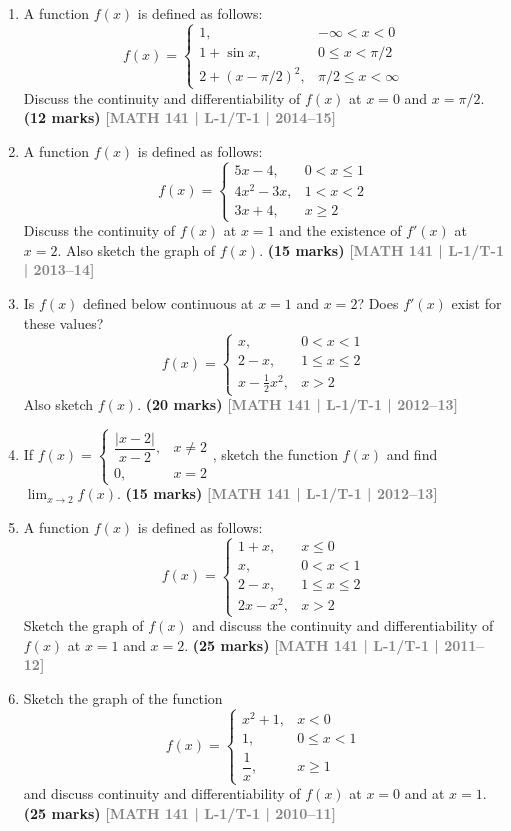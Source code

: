 \documentclass[12pt,a4paper]{article}
\newcommand{\yr}[1]{\hfill\textcolor{gray}{\small\textbf{[#1]}}}
\newcommand{\mk}[1]{\textcolor{orange!70!black}{\small\textbf{(#1 marks)}}}
\begin{document}
\begin{enumerate}
\item A function $f(x)$ is defined as follows:
\[
f(x)=\begin{cases}1, & -\infty<x<0\\ 1+\sin x, & 0\le x<\pi/2\\ 2+(x-\pi/2)^{2}, & \pi/2\le x<\infty\end{cases}
\]
Discuss the continuity and differentiability of $f(x)$ at $x=0$ and $x=\pi/2$.
\mk{12} \yr{MATH 141 | L-1/T-1 | 2014--15}

\item A function $f(x)$ is defined as follows:
\[
f(x)=\begin{cases}5x-4, & 0<x\le 1\\ 4x^{2}-3x, & 1<x<2\\ 3x+4, & x\ge 2\end{cases}
\]
Discuss the continuity of $f(x)$ at $x=1$ and the existence of $f'(x)$ at $x=2$. Also sketch the graph of $f(x)$.
\mk{15} \yr{MATH 141 | L-1/T-1 | 2013--14}

\item Is $f(x)$ defined below continuous at $x=1$ and $x=2$? Does $f'(x)$ exist for these values?
\[
f(x)=\begin{cases}x, & 0<x<1\\ 2-x, & 1\le x\le 2\\ x-\tfrac{1}{2}x^{2}, & x>2\end{cases}
\]
Also sketch $f(x)$.
\mk{20} \yr{MATH 141 | L-1/T-1 | 2012--13}

\item If $f(x)=\begin{cases}\dfrac{|x-2|}{x-2}, & x\neq 2\\[4pt] 0, & x=2\end{cases}$, sketch the function $f(x)$ and find $\displaystyle\lim_{x\to 2}f(x)$.
\mk{15} \yr{MATH 141 | L-1/T-1 | 2012--13}

\item A function $f(x)$ is defined as follows:
\[
f(x)=\begin{cases}1+x, & x\le 0\\ x, & 0<x<1\\ 2-x, & 1\le x\le 2\\ 2x-x^{2}, & x>2\end{cases}
\]
Sketch the graph of $f(x)$ and discuss the continuity and differentiability of $f(x)$ at $x=1$ and $x=2$.
\mk{25} \yr{MATH 141 | L-1/T-1 | 2011--12}

\item Sketch the graph of the function
\[
f(x)=\begin{cases}x^{2}+1, & x<0\\ 1, & 0\le x<1\\ \dfrac{1}{x}, & x\ge 1\end{cases}
\]
and discuss continuity and differentiability of $f(x)$ at $x=0$ and at $x=1$.
\mk{25} \yr{MATH 141 | L-1/T-1 | 2010--11}


\end{enumerate}
\end{document}
